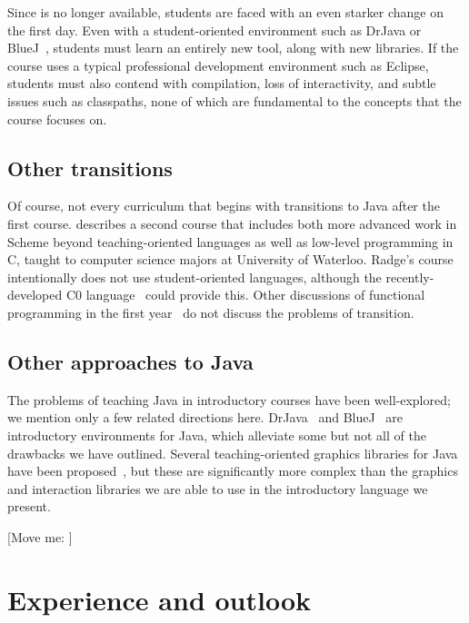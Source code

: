 \documentclass[submission,copyright]{eptcs}
\begin{document}
Since \profj is no longer available, students are faced with an even
starker change on the first day.  Even with a student-oriented
environment such as DrJava or BlueJ~\cite{dvanhorn:Allen2002DrJava,
  dvanhorn:Hsia2005Taming}, students must learn an entirely new tool,
along with new libraries.
If the course uses a typical professional development environment such
as Eclipse, students must also contend with compilation, loss of
interactivity, and subtle issues such as classpaths, none of which are
fundamental to the concepts that the course focuses on.


\subsection{Other transitions}

Of course, not every curriculum that begins with \htdp transitions to
Java after the first course.  \citet{dvanhorn:Ragde2008Chilling}
describes a second course that includes both more advanced work in
Scheme beyond teaching-oriented languages as well as low-level
programming in C, taught to computer science majors at University of
Waterloo.  Radge's course intentionally does not use student-oriented
languages, although the recently-developed C0 language~\cite{local:c0}
could provide this. Other discussions of functional programming in the
first year~\cite{dvanhorn:Chakravarty2004Risks} do not discuss the
problems of transition.

\subsection{Other approaches to Java}

The problems of teaching Java in introductory courses have been
well-explored; we mention only a few related directions here.
DrJava~\cite{dvanhorn:Allen2002DrJava} and
BlueJ~\cite{dvanhorn:Hsia2005Taming,dvanhorn:Kolling2003} are
introductory environments for Java, which alleviate some but not all
of the drawbacks we have outlined.
%
Several teaching-oriented graphics libraries for Java have been
proposed~\cite{dvanhorn:Bruce2001Library,dvanhorn:Alphonce2003Using},
but these are significantly more complex than the graphics and
interaction libraries we are able to use in the introductory language
we present.


[Move me: \cite{local:barland-sfp10}]

\section{Experience and outlook}
\label{sec:conclusion}
\end{document}
